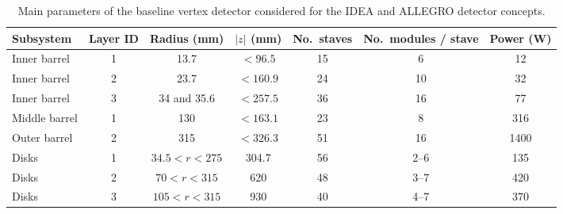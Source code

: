 \begin{table}[t]
\caption{Main parameters of the baseline vertex detector considered for the IDEA and ALLEGRO detector concepts.}
\centering
\footnotesize
\begin{tabular}{l c c c c c c}
\toprule
Subsystem & Layer ID & Radius (mm) & $|z|$ (mm) & No.\ staves & No.\ modules / stave & Power (W) \\
\midrule
Inner barrel & 1 & 13.7 &  $<96.5$ & 15 & 6 & 12\\
Inner barrel & 2 & 23.7 &  $<160.9$ & 24 & 10 & 32\\
Inner barrel & 3 & 34 and 35.6 & $<257.5$ & 36 & 16 & 77 \\
\midrule
Middle barrel & 1 & 130 & $<163.1$ & 23 & 8 & 316\\
Outer barrel & 2 & 315 &  $<326.3$ &  51 & 16  & 1400\\
\midrule
Disks & 1 & $34.5 < r < 275$ & 304.7 & 56 & 2--6 & 135\\
Disks & 2 & $70 < r < 315$ & 620 &   48 & 3--7 & 420\\
Disks & 3 & $105 < r < 315$ & 930 &  40 & 4--7 & 370\\
\bottomrule
\end{tabular}
\label{tab:vertex_details}
\end{table}

